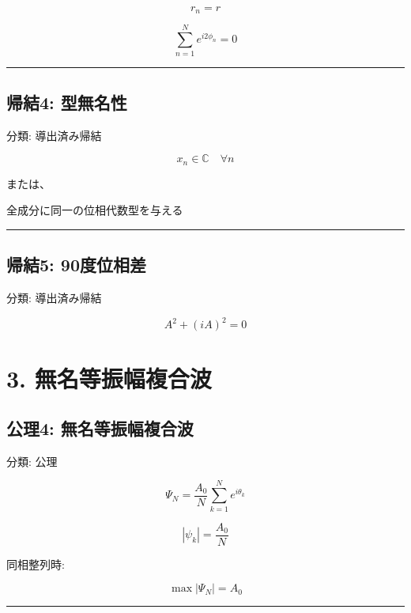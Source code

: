 \documentclass[
  a4paper,
]{ltjsarticle}
\newenvironment{Shaded}{}{}
\newcommand{\NormalTok}[1]{#1}
\begin{document}
\[
r_n=r
\]

\[
\sum_{n=1}^{N}e^{i2\phi_n}=0
\]

\begin{center}\rule{0.5\linewidth}{0.5pt}\end{center}

\subsection{帰結4:
型無名性}\label{ux5e30ux7d504-ux578bux7121ux540dux6027}

分類: 導出済み帰結

\[
x_n\in\mathbb{C}\quad\forall n
\]

または、

\begin{Shaded}
\begin{Highlighting}[]
\NormalTok{全成分に同一の位相代数型を与える}
\end{Highlighting}
\end{Shaded}

\begin{center}\rule{0.5\linewidth}{0.5pt}\end{center}

\subsection{帰結5:
90度位相差}\label{ux5e30ux7d505-90ux5ea6ux4f4dux76f8ux5dee}

分類: 導出済み帰結

\[
A^2+(iA)^2=0
\]

\section{3.
無名等振幅複合波}\label{ux7121ux540dux7b49ux632fux5e45ux8907ux5408ux6ce2}

\subsection{公理4:
無名等振幅複合波}\label{ux516cux74064-ux7121ux540dux7b49ux632fux5e45ux8907ux5408ux6ce2}

分類: 公理

\[
\Psi_N=\frac{A_0}{N}\sum_{k=1}^{N}e^{i\theta_k}
\]

\[
|\psi_k|=\frac{A_0}{N}
\]

同相整列時:

\[
\max|\Psi_N|=A_0
\]

\begin{center}\rule{0.5\linewidth}{0.5pt}\end{center}
\end{document}
